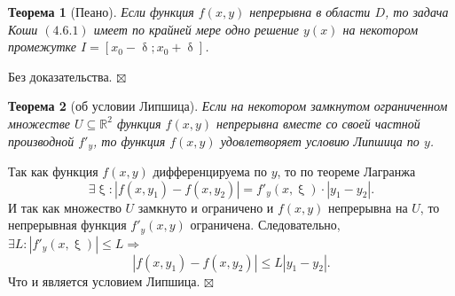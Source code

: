 \documentclass[a4paper, 12pt]{report}
\newenvironment{Proof} %
{\par\noindent{$\blacklozenge$}} %
{\hfill$\scriptstyle\boxtimes$}
\newcommand{\Rm}{\mathbb{R}}
\renewcommand{\leq}{\leqslant}
\renewcommand{\delta}{\updelta}
\renewcommand{\xi}{\upxi}
\newtheorem*{theorem}{Теорема}
\begin{document}
\begin{theorem}
	[Пеано]
	Если функция $f(x,y)$ непрерывна в области $D$, то задача Коши $(4.6.1)$ имеет по крайней мере одно решение $y(x)$ на некотором промежутке $I = [ x_0 - \delta; x_0 + \delta]$.
\end{theorem}
\begin{Proof}
	Без доказательства.
\end{Proof}
\begin{theorem}
	[об условии Липшица]
	Если на некотором замкнутом ограниченном множестве $U\subseteq \Rm^2$ функция $f(x,y)$ непрерывна вместе со своей частной производной $f'_y$, то функция $f(x,y)$ удовлетворяет условию Липшица по $y$.
\end{theorem}
\begin{Proof}
		Так как функция $f(x,y)$ дифференцируема по $y$, то по теореме Лагранжа $$\exists \xi: |f(x,y_1) - f(x,y_2)| = f'_y(x,\xi)\cdot |y_1 - y_2|.$$ И так как множество $U$ замкнуто и ограничено и $f(x,y)$ непрерывна на $U$, то непрерывная функция $f'_y(x,y)$ ограничена. Следовательно, $\exists L : |f'_y(x,\xi)| \leq L \Rightarrow$ $$|f(x,y_1) - f(x,y_2)| \leq L|y_1 - y_2|.$$
		Что и является условием Липшица.
\end{Proof}
\end{document}
